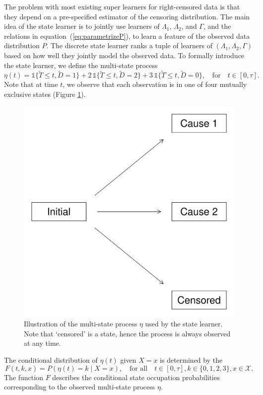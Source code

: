 \documentclass{statsoc}
\numberwithin{theorem}{section}
\newcommand{\1}{\mathds{1}}
\begin{document}
The problem with most existing super learners for right-censored data is that
they depend on a pre-specified estimator of the censoring distribution. The main
idea of the state learner is to jointly use learners of \( \Lambda_1 \),
\( \Lambda_2 \), and \( \Gamma \), and the relations in
equation~(\ref{eq:parametrizeP}), to learn a feature of the observed data
distribution \( P \). The discrete state learner ranks a tuple of learners of
\( (\Lambda_1, \Lambda_2, \Gamma) \) based on how well they jointly model the
observed data. To formally introduce the state learner, we define the
multi-state process
\begin{equation*}
  \eta(t) = \1\{\tilde{T} \leq t, \tilde D=1\} + 2\,\1\{\tilde{T} \leq t, \tilde D=2\}+ 3\,\1\{\tilde{T} \leq t, \tilde D=0\},
  \quad \text{for} \quad t \in [0, \tau].
\end{equation*}
Note that at time \(t\), we observe that each observation is in one of four
mutually exclusive states (Figure \ref{fig:multi-state-process}).
\begin{figure}[h]
  \centering
  \includegraphics[width=.5\textwidth]{./figure-multi-state-process.pdf}
  \caption{Illustration of the multi-state process \(\eta\) used by
    the state learner. Note that `censored' is a state, hence the
    process is always observed at any time.}
  \label{fig:multi-state-process}
\end{figure}
The conditional distribution of \( \eta(t) \) given \( X=x \) is determined by
the 
\begin{equation}
  \label{eq:F-def}
  F(t, k, x) = P(\eta(t) = k \mid X=x),
  \quad \text{for all} \quad
  t \in [0,\tau],
  k \in \{0,1,2,3\},
  x \in \mathcal{X}.
\end{equation}
The function \( F \) describes the conditional state occupation
probabilities corresponding to the observed multi-state process
\(\eta\).
\end{document}
